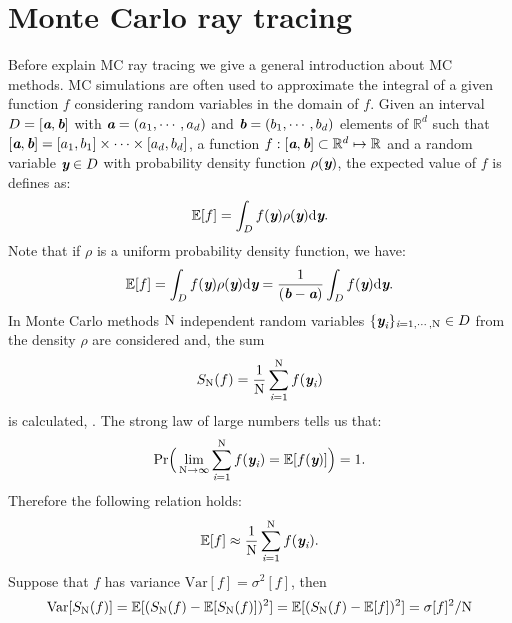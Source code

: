 \section{Monte Carlo ray tracing}
Before explain MC ray tracing we give a general introduction about MC methods. MC simulations are often used to approximate the integral of a given function $f$ considering random variables in the domain of $f$. Given an interval $D = [\textit{\textbf{a}}, \textit{\textbf{b}}]$ with $\textit{\textbf{a}} = (a_1, \cdots, a_d)$ and $\textit{\textbf{b}} = (b_1, \cdots, b_d)$ elements of $\mathbb{R}^d$ such that
$[\textit{\textbf{a}}, \textit{\textbf{b}}]  = [a_1, b_1] \times \cdots \times [a_d, b_d]$, a function $f:[\textit{\textbf{a}},\textit{\textbf{b}}]\subset \mathbb{R}^d \mapsto \mathbb{R}$ and a random variable 
$\textit{\textbf{y}}\in D$ with probability density function $\rho(\textit{\textbf{y}})$, the expected value of $f$ is defines as:
\begin{equation}
\mathbb{E}[f] =\int_{D}f(\textit{\textbf{y}})\rho(\textit{\textbf{y}}) \textrm{d}\textit{\textbf{y}}.
\end{equation}
Note that if $\rho$ is a uniform probability density function, we have:
\begin{equation}
\mathbb{E}[f] = \int_{D}f(\textit{\textbf{y}})\rho(\textit{\textbf{y}}) \textrm{d}\textit{\textbf{y}} =\frac{1}{(\textit{\textbf{b}}-\textit{\textbf{a}})} \int_{D}f(\textit{\textbf{y}}) \textrm{d}\textit{\textbf{y}}.
\end{equation}
In Monte Carlo methods $\textrm{N}$ independent random variables  $\{\textit{\textbf{y}}_{\textit{i}}\}_{\textit{i} = 1, \cdots, \textrm{N}}\in D$ 
from the density $\rho$ are considered and, the sum
\begin{equation}
S_{\textrm{N}}(f) = \frac{1}{\textrm{N}} \sum_{\textit{i}=1}^{\textrm{N}} f(\textit{\textbf{y}}_{\textit{i}})
\end{equation}
is calculated,  \cite{owen2003quasi}.
The strong law of large numbers tells us that:
\begin{equation}
\textrm{Pr}\Big(\lim_{\textrm{N}\rightarrow\infty}\sum_{\textit{i}=1}^{\textrm{N}} f(\textit{\textbf{y}}_{\textit{i}}) = \mathbb{E}[f(\textit{\textbf{y}})] \Big) = 1.
\end{equation}
Therefore the following relation holds:
\begin{equation}
\mathbb{E}[f] \approx \frac{1}{\textrm{N}} \sum_{\textit{i}=1}^{\textrm{N}} f(\textit{\textbf{y}}_{\textit{i}}).
\end{equation}
Suppose that $f$ has variance $\textrm{Var}[f]=\sigma^2[f] $, then
\begin{equation}
\textrm{Var}[S_{\textrm{N}}(f)] = \mathbb{E}[(S_{\textrm{N}}(f)-\mathbb{E}[S_{\textrm{N}}(f)])^2]= \mathbb{E}[(S_{\textrm{N}}(f)-\mathbb{E}[f])^2] = \sigma[f]^2/\textrm{N}
\end{equation}
